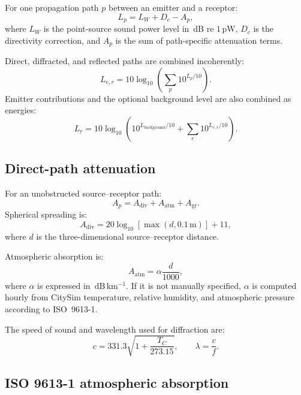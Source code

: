 \documentclass[11pt,a4paper]{article}
\newcommand{\unit}[1]{\,\mathrm{#1}}
\begin{document}
For one propagation path $p$ between an emitter and a receptor:
\begin{equation}
  L_{p} = L_W + D_c - A_{p},
\end{equation}
where $L_W$ is the point-source sound power level in
$\unit{dB}$ re $1\unit{pW}$, $D_c$ is the directivity correction, and $A_p$ is
the sum of path-specific attenuation terms.

Direct, diffracted, and reflected paths are combined incoherently:
\begin{equation}
  L_{e,r} = 10\log_{10}\left(\sum_p 10^{L_p/10}\right).
\end{equation}
Emitter contributions and the optional background level are also combined as
energies:
\begin{equation}
  L_r = 10\log_{10}\left(
    10^{L_{\mathrm{background}}/10}
    + \sum_e 10^{L_{e,r}/10}
  \right).
\end{equation}

\subsection{Direct-path attenuation}

For an unobstructed source--receptor path:
\begin{equation}
  A_p = A_{\mathrm{div}} + A_{\mathrm{atm}} + A_{\mathrm{gr}}.
\end{equation}
Spherical spreading is:
\begin{equation}
  A_{\mathrm{div}} = 20\log_{10}\left[\max(d,0.1\unit{m})\right]+11,
  \label{eq:noise-div}
\end{equation}
where $d$ is the three-dimensional source--receptor distance.

Atmospheric absorption is:
\begin{equation}
  A_{\mathrm{atm}} = \alpha\frac{d}{1000},
  \label{eq:noise-atm}
\end{equation}
where $\alpha$ is expressed in $\unit{dB\,km^{-1}}$. If it is not manually
specified, $\alpha$ is computed hourly from CitySim temperature, relative
humidity, and atmospheric pressure according to ISO~9613-1.

The speed of sound and wavelength used for diffraction are:
\begin{equation}
  c = 331.3\sqrt{1+\frac{T_C}{273.15}},
  \qquad
  \lambda=\frac{c}{f}.
\end{equation}

\subsection{ISO 9613-1 atmospheric absorption}
\end{document}
